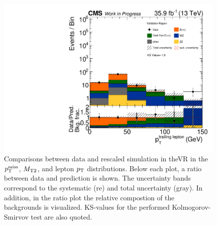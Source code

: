 \begin{figure}[tbp]
 \includegraphics[width=\pairwidth]{figures/plots_VR/VR_LL_pt2_log}
 \caption{Comparisons between data and rescaled simulation in theVR in the $p_{\mathrm{T}}^\text{miss}$, $M_{\mathrm{T2}}$, and lepton $p_{\mathrm{T}}$ distributions. Below each plot, a ratio between data and prediction is shown. The uncertainty bands correspond to the systematic (re) and total uncertainty (gray). In addition, in the ratio plot the relative compostion of the backgrounds is visualized. KS-values for the performed Kolmogorov-Smirvov test are also quoted.}
 \label{fig:VR1}
\end{figure}


